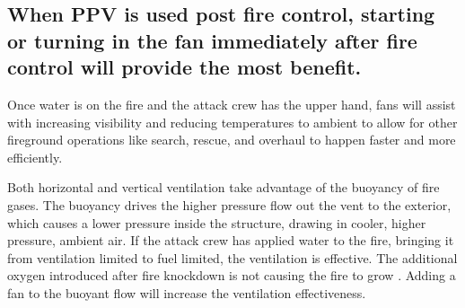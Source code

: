 \documentclass{article}
\begin{document}
\subsection{When PPV is used post fire control, starting or turning in the fan immediately after fire control will provide the most benefit.}  
Once water is on the fire and the attack crew has the upper hand, fans will assist with increasing visibility and reducing temperatures to ambient to allow for other fireground operations like search, rescue, and overhaul to happen faster and more efficiently.  

Both horizontal and vertical ventilation take advantage of the buoyancy of fire gases. The buoyancy drives the higher pressure flow out the vent to the exterior, which causes a lower pressure inside the structure, drawing in cooler, higher pressure, ambient air. If the attack crew has applied water to the fire, bringing it from ventilation limited to fuel limited, the ventilation is effective. The additional oxygen introduced after fire knockdown is not causing the fire to grow \cite{DHS2008} \cite{DHS2010}. Adding a fan to the buoyant flow will increase the ventilation effectiveness. 
\end{document}
